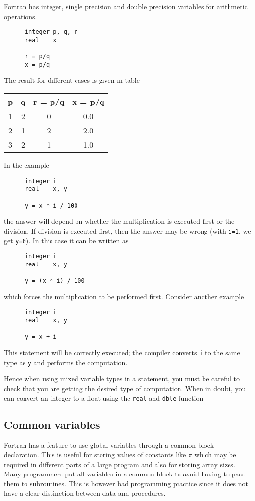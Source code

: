 \documentclass[11pt,oneside]{amsart}
\begin{document}
Fortran has integer, single precision and double precision variables for arithmetic operations.
\begin{verbatim}
      integer p, q, r
      real    x

      r = p/q
      x = p/q
\end{verbatim}
The result for different cases is given in table
\begin{center}
\begin{tabular}{|c|c|c|c|}
\hline
p & q & r = p/q & x = p/q \\
\hline
1 & 2 & 0 & 0.0\\
\hline
2 & 1 & 2 & 2.0 \\
\hline
3 & 2 & 1 & 1.0 \\
\hline
\end{tabular}
\end{center}
In the example
\begin{verbatim}
      integer i
      real    x, y

      y = x * i / 100
\end{verbatim}
the answer will depend on whether the multiplication is executed first or the division. If division is executed first, then the answer may be wrong (with {\tt i=1}, we get {\tt y=0}). In this case it can be written as
\begin{verbatim}
      integer i
      real    x, y

      y = (x * i) / 100
\end{verbatim}
which forces the multiplication to be performed first. Consider another example
\begin{verbatim}
      integer i
      real    x, y

      y = x + i
\end{verbatim}
This statement will be correctly executed; the compiler converts {\tt i} to the same type as {\tt y} and performs the computation.

Hence when using mixed variable types in a statement, you must be careful to check that you are getting the desired type of computation. When in doubt, you can convert an integer to a float using the {\tt real} and {\tt dble} function.

\subsection{Common variables}

Fortran has a feature to use global variables through a common block declaration. This is useful for storing values of constants like $\pi$ which may be required in different parts of a large program and also for storing array sizes. Many programmers put all variables in a common block to avoid having to pass them to subroutines. This is however bad programming practice since it does not have a clear distinction between data and procedures.
\end{document}
